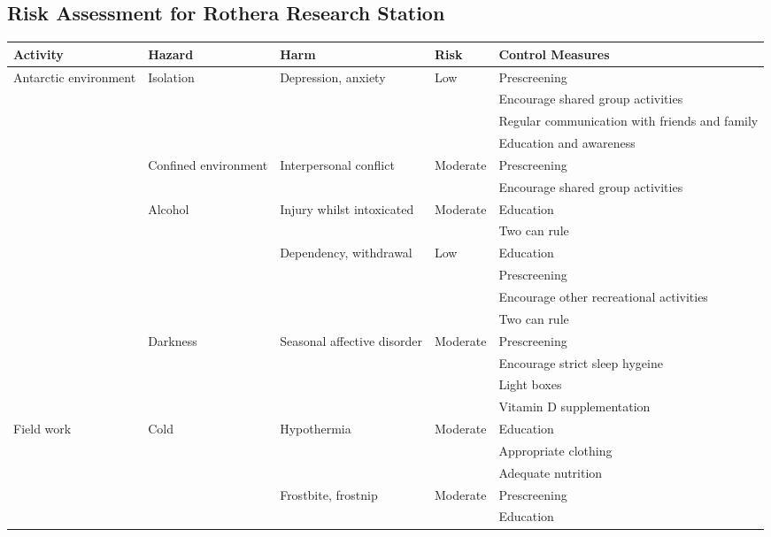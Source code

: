 \appendix
\begin{landscape}
    \section{Risk Assessment for Rothera Research Station}
    \label{sec:risk}
    \begin{longtabu} to\linewidth{X[l] X[l] X[l] X[l] X[2,l]}
        \toprule
        \rowfont\bfseries Activity & Hazard & Harm & Risk & Control Measures \\
        \midrule
        \endhead
        Antarctic environment & Isolation & Depression, anxiety & Low & Prescreening \\
         &  &  &  & Encourage shared group activities \\
         &  &  &  & Regular communication with friends and family \\
         &  &  &  & Education and awareness \\
         & Confined environment & Interpersonal conflict & Moderate & Prescreening \\
         &  &  &  & Encourage shared group activities \\
         & Alcohol & Injury whilst intoxicated & Moderate & Education \\
         &  &  &  & Two can rule \\
         &  & Dependency, withdrawal & Low & Education \\
         &  &  &  & Prescreening \\
         &  &  &  & Encourage other recreational activities \\
         &  &  &  & Two can rule \\
         & Darkness & Seasonal affective disorder & Moderate & Prescreening \\
         &  &  &  & Encourage strict sleep hygeine \\
         &  &  &  & Light boxes \\
         &  &  &  & Vitamin D supplementation \\
        \midrule
        Field work & Cold & Hypothermia & Moderate & Education \\
         &  &  &  & Appropriate clothing \\
         &  &  &  & Adequate nutrition \\
         &  & Frostbite, frostnip & Moderate & Prescreening \\
         &  &  &  & Education \\

\end{longtabu}
\end{landscape}
